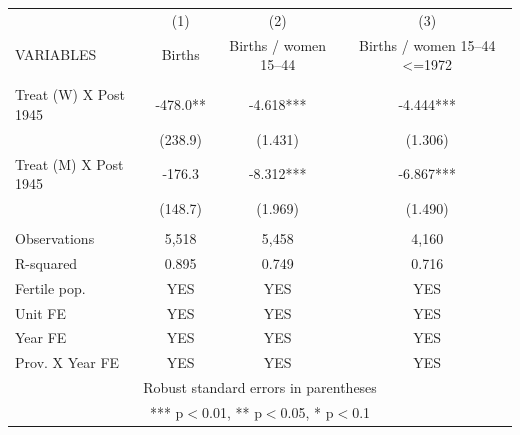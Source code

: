 \begin{tabular}{lccc} \hline
 & (1) & (2) & (3) \\
VARIABLES & Births & Births / women 15--44 & Births / women 15--44 <=1972 \\ \hline
 &  &  &  \\
Treat (W) X Post 1945 & -478.0** & -4.618*** & -4.444*** \\
 & (238.9) & (1.431) & (1.306) \\
Treat (M) X Post 1945 & -176.3 & -8.312*** & -6.867*** \\
 & (148.7) & (1.969) & (1.490) \\
 &  &  &  \\
Observations & 5,518 & 5,458 & 4,160 \\
R-squared & 0.895 & 0.749 & 0.716 \\
Fertile pop. & YES & YES & YES \\
Unit FE & YES & YES & YES \\
Year FE & YES & YES & YES \\
 Prov. X Year FE & YES & YES & YES \\ \hline
\multicolumn{4}{c}{ Robust standard errors in parentheses} \\
\multicolumn{4}{c}{ *** p$<$0.01, ** p$<$0.05, * p$<$0.1} \\
\end{tabular}
